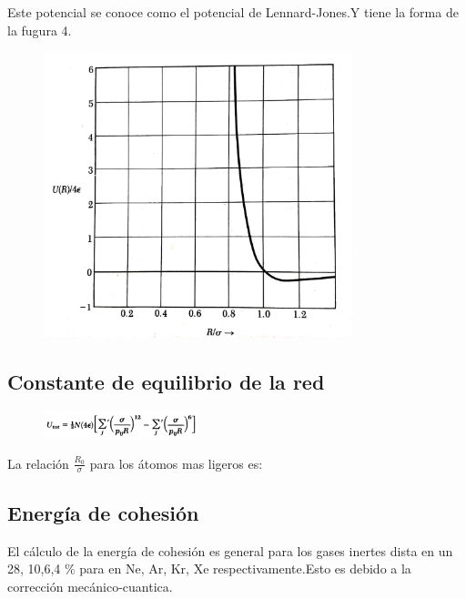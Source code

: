 \documentclass{article}
\begin{document}
Este potencial se conoce como el potencial de Lennard-Jones.Y tiene la forma de la fugura 4. \cite{Maza}

\begin{figure}[h]
\centering
\includegraphics[width=0.8\textwidth]{a2.jpeg}
\caption{}
\end{figure}




\subsection{Constante de equilibrio de la red}

\begin{figure}[h]
\centering
\includegraphics[width=0.4\textwidth]{a3.png}
\end{figure}

La relación $\frac{R_0}{\sigma}$ para los átomos mas ligeros es:
\\
\subsection{Energía de cohesión}

El cálculo de la energía de cohesión es general para los gases inertes dista en un 28, 10,6,4 \% para en Ne, Ar, Kr, Xe respectivamente.Esto es debido a la corrección mecánico-cuantica.\\
\end{document}
